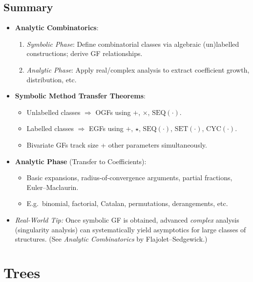 \documentclass[11pt,letterpaper]{article}
\begin{document}
\subsection{Summary}
\begin{itemize}
  \item \textbf{Analytic Combinatorics}:
    \begin{enumerate}
      \item \emph{Symbolic Phase}: Define combinatorial classes via algebraic (un)labelled constructions; derive GF relationships.
      \item \emph{Analytic Phase}: Apply real/complex analysis to extract coefficient growth, distribution, etc.
    \end{enumerate}
  \item \textbf{Symbolic Method Transfer Theorems}:
    \begin{itemize}
      \item Unlabelled classes $\Rightarrow$ OGFs using $+$, $\times$, $\mathrm{SEQ}(\cdot)$.
      \item Labelled classes $\Rightarrow$ EGFs using $+$, $\star$, $\mathrm{SEQ}(\cdot)$, $\mathrm{SET}(\cdot)$, $\mathrm{CYC}(\cdot)$.
      \item Bivariate GFs track size + other parameters simultaneously.
    \end{itemize}
  \item \textbf{Analytic Phase} (Transfer to Coefficients):
    \begin{itemize}
      \item Basic expansions, radius-of-convergence arguments, partial fractions, Euler--Maclaurin.
      \item E.g.\ binomial, factorial, Catalan, permutations, derangements, etc.
    \end{itemize}
  \item \emph{Real-World Tip:} Once symbolic GF is obtained, advanced \emph{complex} analysis (singularity analysis) can systematically yield asymptotics for large classes of structures. (See \emph{Analytic Combinatorics} by Flajolet--Sedgewick.)
\end{itemize}
\clearpage
\section{Trees}
\end{document}
